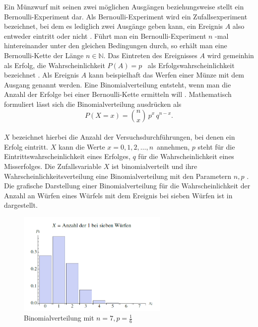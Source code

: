Ein Münzwurf mit seinen zwei möglichen Ausgängen \grqq{} beziehungsweise \grqq{} stellt ein Bernoulli-Experiment dar. Als Bernoulli-Experiment wird ein Zufallsexperiment bezeichnet, bei dem es lediglich zwei Ausgänge geben kann, ein Ereignis $A$ also entweder eintritt oder nicht \cite{Teschl.2014}. Führt man ein Bernoulli-Experiment $n$ -mal hintereinander unter den gleichen Bedingungen durch, so erhält man eine Bernoulli-Kette der Länge $n \in \mathbb{N}$. Das Eintreten des Ereignisses $A$ wird gemeinhin als Erfolg, die Wahrscheinlichkeit $P(A)=p$ \,  als Erfolgswahrscheinlichkeit bezeichnet \cite{Teschl.2014}. Als Ereignis $A$ kann beispielhaft das Werfen einer Münze mit dem Ausgang \grqq{} genannt werden. Eine Binomialverteilung entsteht, wenn man die Anzahl der Erfolge bei einer Bernoulli-Kette ermitteln will \cite{Teschl.2014}. Mathematisch formuliert lässt sich die Binomialverteilung ausdrücken als
\begin{equation}
	\label{eq:Binomialverteilung}
	P(X=x) = \binom{n}{x} \, p^{x} \, q^{n-x} .
\end{equation}\\
$X$ bezeichnet hierbei die Anzahl der Versuchsdurchführungen, bei denen ein Erfolg eintritt. $X$ kann die Werte $x = 0,1,2,\dots,n$\, annehmen, $p$ steht für die Eintrittswahrscheinlichkeit eines Erfolges, $q$ für die Wahrscheinlichkeit eines Misserfolges. Die Zufallsvariable $X$ ist binomialverteilt und ihre Wahrscheinlichkeitsverteilung eine Binomialverteilung mit den Parametern $n,p$ \cite{Teschl.2014}. Die grafische Darstellung einer Binomialverteilung für die Wahrscheinlichkeit der Anzahl an Würfen eines Würfels mit dem Ereignis \grqq{} bei sieben Würfen ist in  dargestellt.

\begin{figure}[!ht]
	\begin{center}
		\includegraphics[height=50mm]{Abbildungen/grundlagen/Binomverteilung}
		\caption[Binomialverteilung Beispiel]{Binomialverteilung mit $n = 7, p = \frac{1}{6}$\,  \cite{Teschl.2014}}
		\label{fig.Poisson_Verteilung}
	\end{center}
\end{figure}
